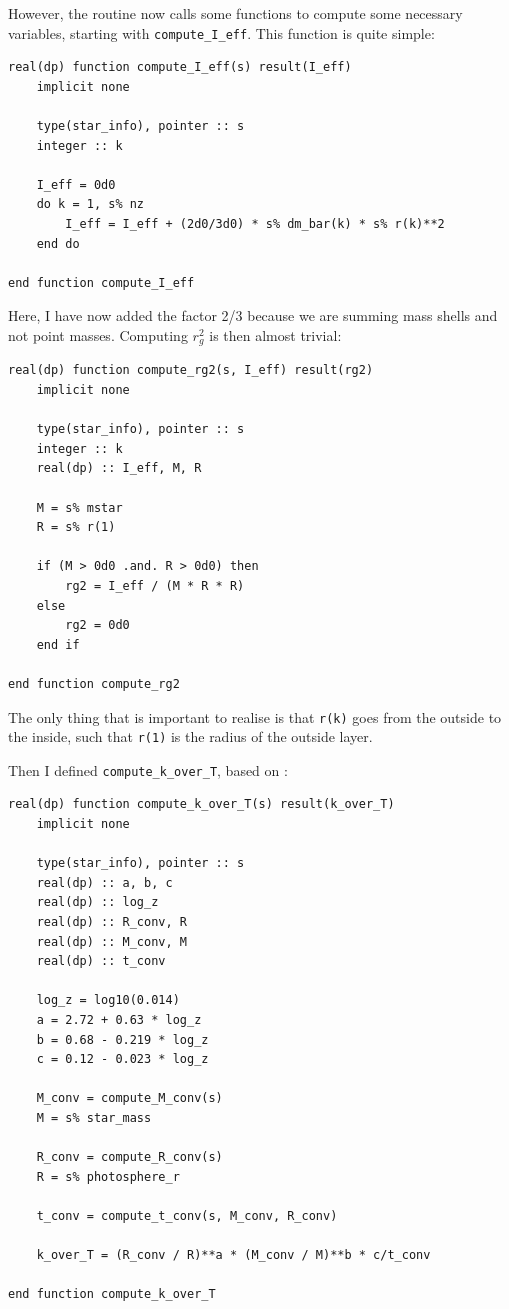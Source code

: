 \documentclass[a4paper,10pt]{article}
\begin{document}
However, the routine now calls some functions to compute some necessary variables, starting with \lstinline[style=output, breaklines=true]|compute_I_eff|. This function is quite simple:
\begin{verbatim}
real(dp) function compute_I_eff(s) result(I_eff)
    implicit none

    type(star_info), pointer :: s
    integer :: k

    I_eff = 0d0
    do k = 1, s% nz
        I_eff = I_eff + (2d0/3d0) * s% dm_bar(k) * s% r(k)**2
    end do

end function compute_I_eff
\end{verbatim}
Here, I have now added the factor 2/3 because we are summing mass shells and not point masses. Computing \(r_{g}^{2} \) is then almost trivial:
\begin{verbatim}
real(dp) function compute_rg2(s, I_eff) result(rg2)
    implicit none

    type(star_info), pointer :: s
    integer :: k
    real(dp) :: I_eff, M, R

    M = s% mstar
    R = s% r(1)

    if (M > 0d0 .and. R > 0d0) then
        rg2 = I_eff / (M * R * R)
    else
        rg2 = 0d0
    end if

end function compute_rg2
\end{verbatim}
The only thing that is important to realise is that \lstinline[style=output, breaklines=true]|r(k)| goes from the outside to the inside, such that \lstinline[style=output, breaklines=true]|r(1)| is the radius of the outside layer.

Then I defined \lstinline[style=output, breaklines=true]|compute_k_over_T|, based on \citet{preece2022}:
\begin{verbatim}
real(dp) function compute_k_over_T(s) result(k_over_T)
    implicit none

    type(star_info), pointer :: s
    real(dp) :: a, b, c
    real(dp) :: log_z
    real(dp) :: R_conv, R
    real(dp) :: M_conv, M
    real(dp) :: t_conv

    log_z = log10(0.014)
    a = 2.72 + 0.63 * log_z
    b = 0.68 - 0.219 * log_z
    c = 0.12 - 0.023 * log_z

    M_conv = compute_M_conv(s)
    M = s% star_mass

    R_conv = compute_R_conv(s)
    R = s% photosphere_r

    t_conv = compute_t_conv(s, M_conv, R_conv)

    k_over_T = (R_conv / R)**a * (M_conv / M)**b * c/t_conv

end function compute_k_over_T
\end{verbatim}
\end{document}
